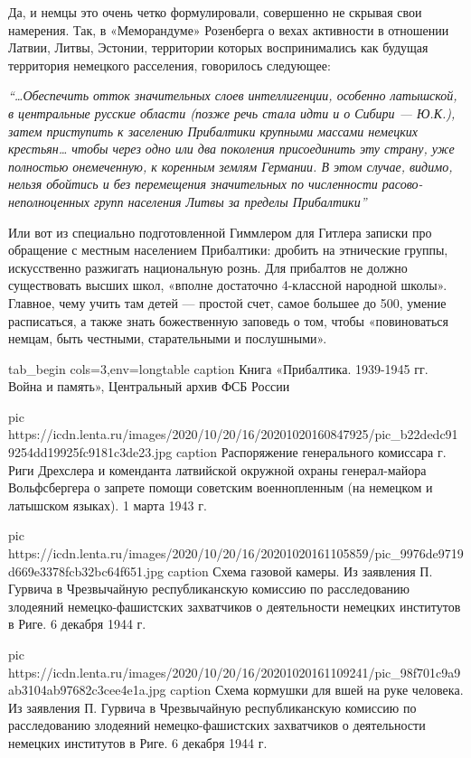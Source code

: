 
Да, и немцы это очень четко формулировали, совершенно не скрывая свои
намерения. Так, в «Меморандуме» Розенберга о вехах активности в отношении
Латвии, Литвы, Эстонии, территории которых воспринимались как будущая
территория немецкого расселения, говорилось следующее:

\begin{leftbar}
				\em
				\enquote{…Обеспечить отток значительных слоев интеллигенции, особенно латышской, в
центральные русские области (позже речь стала идти и о Сибири — Ю.К.),
затем приступить к заселению Прибалтики крупными массами немецких
крестьян… чтобы через одно или два поколения присоединить эту страну,
уже полностью онемеченную, к коренным землям Германии. В этом случае,
видимо, нельзя обойтись и без перемещения значительных по численности
				расово-неполноценных групп населения Литвы за пределы Прибалтики}
\end{leftbar}

Или вот из специально подготовленной Гиммлером для Гитлера записки про
обращение с местным населением Прибалтики: дробить на этнические группы,
искусственно разжигать национальную рознь. Для прибалтов не должно существовать
высших школ, «вполне достаточно 4-классной народной школы». Главное, чему учить
там детей — простой счет, самое большее до 500, умение расписаться, а также
знать божественную заповедь о том, чтобы «повиноваться немцам, быть честными,
старательными и послушными».

\ifcmt
tab_begin cols=3,env=longtable
	caption Книга «Прибалтика. 1939-1945 гг. Война и память», Центральный архив ФСБ России

	pic https://icdn.lenta.ru/images/2020/10/20/16/20201020160847925/pic_b22dedc919254dd19925fc9181c3de23.jpg
	caption Распоряжение генерального комиссара г. Риги Дрехслера и коменданта латвийской окружной охраны генерал-майора Вольфсбергера о запрете помощи советским военнопленным (на немецком и латышском языках). 1 марта 1943 г.

	pic https://icdn.lenta.ru/images/2020/10/20/16/20201020161105859/pic_9976de9719d669e3378fcb32bc64f651.jpg
	caption Схема газовой камеры. Из заявления П. Гурвича в Чрезвычайную республиканскую комиссию по расследованию злодеяний немецко-фашистских захватчиков о деятельности немецких институтов в Риге. 6 декабря 1944 г.

	pic https://icdn.lenta.ru/images/2020/10/20/16/20201020161109241/pic_98f701c9a9ab3104ab97682c3cee4e1a.jpg
	caption Схема кормушки для вшей на руке человека. Из заявления П. Гурвича в Чрезвычайную республиканскую комиссию по расследованию злодеяний немецко-фашистских захватчиков о деятельности немецких институтов в Риге. 6 декабря 1944 г.
\fi

